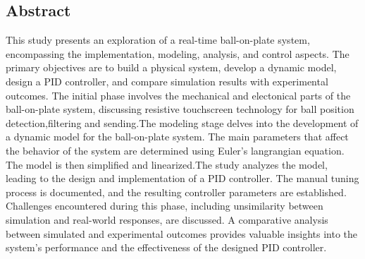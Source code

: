 \documentclass[12pt,oneside]{book}
\begin{document}
\begin{doublespacing}
\chapter*{Abstract}
{ \large This study presents an exploration of a real-time ball-on-plate system, encompassing the implementation, modeling, analysis, and control aspects. The primary objectives are to build a physical system, develop a dynamic model, design a PID controller, and compare simulation results with experimental outcomes. The initial phase involves the mechanical and electonical parts of the ball-on-plate system, discussing resistive touchscreen technology for ball position detection,filtering and sending.The modeling stage delves into the development of a dynamic model for the ball-on-plate system. The main parameters that affect the behavior of the system are determined using Euler's langrangian equation. The model is then simplified and linearized.The study analyzes the model, leading to the design and implementation of a PID controller. The manual tuning process is documented, and the resulting controller parameters are established. Challenges encountered during this phase, including unsimilarity between simulation and real-world responses, are discussed.
A comparative analysis between simulated and experimental outcomes provides valuable insights into the system's performance and the effectiveness of the designed PID controller.  }
\end{doublespacing}

\restoregeometry
\end{document}
